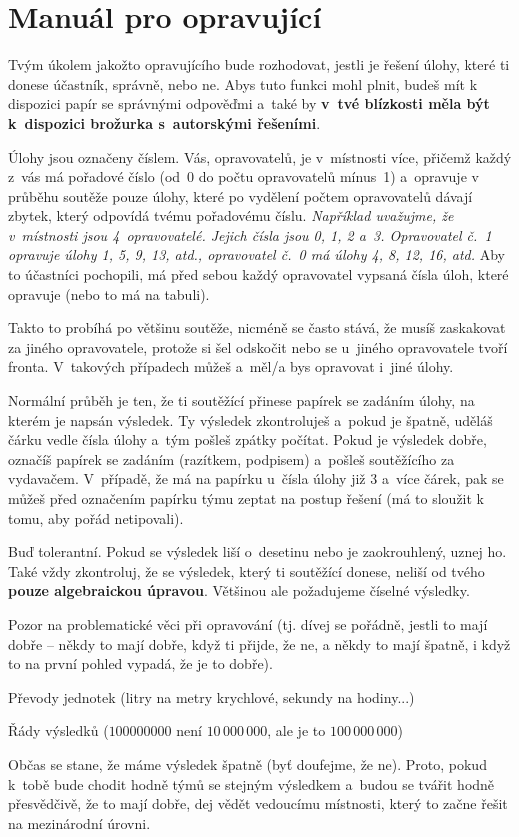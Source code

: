 \documentclass[vyfuk,\classoptions]{fksempty}
\begin{document}
\section{Manuál pro opravující}

Tvým úkolem jakožto opravujícího bude rozhodovat, jestli je řešení úlohy, 
které ti donese účastník, správně, nebo ne. Abys tuto funkci mohl plnit, 
budeš mít k dispozici papír se správnými odpověďmi a~také by {\bf v~tvé 
blízkosti měla být k~dispozici brožurka s~autorskými řešeními}.

\smallskip

Úlohy jsou označeny číslem. Vás, opravovatelů, je v~místnosti více, 
přičemž každý z~vás má pořadové číslo (od~0 do počtu opravovatelů mínus~1)
a~opravuje v průběhu soutěže pouze úlohy, které po vydělení počtem opravovatelů
dávají zbytek, který odpovídá tvému pořadovému číslu. \textit{Například
uvažujme, že v~místnosti jsou 4~opravovatelé. Jejich čísla jsou 0, 1, 2 a~3.
Opravovatel č.~1 opravuje úlohy 1, 5, 9, 13, atd., opravovatel č.~0 má
úlohy 4, 8, 12, 16, atd.} Aby to účastníci pochopili,
má před sebou každý opravovatel vypsaná čísla úloh, které opravuje (nebo to 
má na tabuli).

Takto to probíhá po většinu soutěže, nicméně se často stává, že musíš zaskakovat 
za jiného opravovatele, protože si šel odskočit nebo se u~jiného 
opravovatele tvoří fronta. V~takových případech můžeš a~měl/a bys opravovat i~jiné úlohy.

\smallskip

Normální průběh je ten, že ti soutěžící přinese papírek se zadáním úlohy, 
na kterém je napsán výsledek. Ty výsledek zkontroluješ a~pokud je špatně, uděláš čárku 
vedle čísla úlohy a~tým pošleš zpátky počítat. Pokud je výsledek dobře, označíš papírek 
se zadáním (razítkem, podpisem) a~pošleš soutěžícího za vydavačem. V~případě, že má
na papírku u~čísla úlohy již 3 a~více čárek, pak se můžeš před označením papírku 
týmu zeptat na postup řešení 
(má to sloužit k tomu, aby pořád netipovali).

\smallskip

Buď tolerantní. Pokud se výsledek liší o~desetinu nebo je zaokrouhlený, uznej ho. 
Také vždy zkontroluj, že se výsledek, který ti soutěžící donese, neliší od tvého 
{\bf pouze algebraickou úpravou}. Většinou ale požadujeme číselné výsledky.

Pozor na problematické věci při opravování (tj. dívej se pořádně, jestli to mají
dobře -- někdy to mají dobře, když ti přijde, že ne, a někdy to mají špatně, i když to na 
první pohled vypadá, že je to dobře).
\begin{compactitem}
	\item Převody jednotek (litry na metry krychlové, sekundy na hodiny...)
	\item Řády výsledků ($100000000$ není $10\,000\,000$, ale je to $100\,000\,000$)
\end{compactitem}

\smallskip

Občas se stane, že máme výsledek špatně (byť doufejme, že ne). Proto, pokud 
k~tobě bude chodit hodně týmů se stejným výsledkem a~budou se tvářit hodně přesvědčivě, 
že to mají dobře, dej vědět vedoucímu místnosti, který to začne řešit na mezinárodní úrovni.
\end{document}

